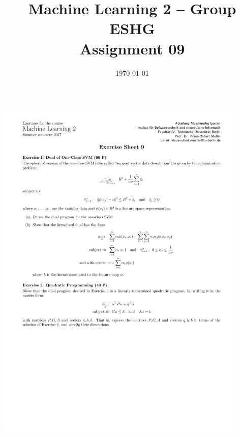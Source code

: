 \documentclass[11pt,a4paper]{article}
\title{Machine Learning 2 -- Group ESHG \\
        Assignment 09
}
\author{\students}
\date{\today}
\begin{document}
\maketitle

\includegraphics[clip, trim=0.5cm 2.5cm 0.5cm 4cm, width=0.90\textwidth]{sheet09.pdf}


\end{document}
